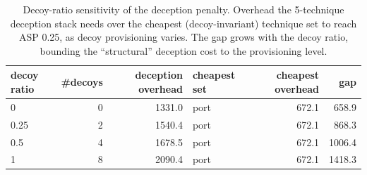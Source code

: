 \begin{table}[t]
\centering
\caption{Decoy-ratio sensitivity of the deception penalty. Overhead the 5-technique deception stack needs over the cheapest (decoy-invariant) technique set to reach ASP 0.25, as decoy provisioning varies. The gap grows with the decoy ratio, bounding the ``structural'' deception cost to the provisioning level.}
\label{tab:decoy_ratio_sweep}
\begin{tabular}{lrrlrr}
\toprule
decoy ratio & \#decoys & deception overhead & cheapest set & cheapest overhead & gap \\
\midrule
0 & 0 & 1331.0 & port & 672.1 & 658.9 \\
0.25 & 2 & 1540.4 & port & 672.1 & 868.3 \\
0.5 & 4 & 1678.5 & port & 672.1 & 1006.4 \\
1 & 8 & 2090.4 & port & 672.1 & 1418.3 \\
\bottomrule
\end{tabular}
\end{table}
